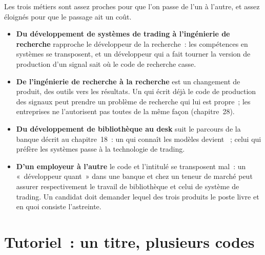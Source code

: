 Les trois métiers sont assez proches pour que l'on passe de l'un à l'autre, et assez éloignés pour que le passage ait un coût.
\begin{itemize}
\item \textbf{Du développement de systèmes de trading à l'ingénierie de recherche} rapproche le développeur de la recherche~: les compétences en systèmes
se transposent, et un développeur qui a fait tourner la version de production d'un signal sait où le code de recherche casse.
\item \textbf{De l'ingénierie de recherche à la recherche} est un changement de produit, des outils vers les résultats. Un  qui écrit déjà le
code de production des signaux peut prendre un problème de recherche qui lui est propre~; les entreprises ne l'autorisent pas toutes de la même façon
(chapitre~28).
\item \textbf{Du développement de bibliothèque au desk} suit le parcours de la banque décrit au chapitre~18~: un  qui connaît les modèles
devient ~; celui qui préfère les systèmes passe à la technologie de trading.
\item \textbf{D'un employeur à l'autre} le code et l'intitulé se transposent mal~: un «~développeur quant~» dans une banque et chez un teneur
de marché peut assurer respectivement le travail de bibliothèque et celui de système de trading. Un candidat doit demander lequel des trois produits
le poste livre et en quoi consiste l'astreinte.
\end{itemize}

\section{Tutoriel~: un titre, plusieurs codes}\label{tut:in:quant-developer:tut}

